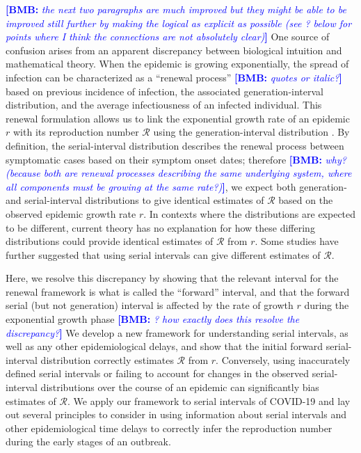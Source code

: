\documentclass[12pt]{article}
\newcommand{\comment}{\showcomment}
\newcommand{\showcomment}[3]{\textcolor{#1}{\textbf{[#2: }\textsl{#3}\textbf{]}}}
\newcommand{\bmb}[1]{\comment{blue}{BMB}{#1}}
\newcommand{\RR}{\ensuremath{{\mathcal R}}\xspace}
\begin{document}
\bmb{the next two paragraphs are much improved but they might be able to be improved still further by making the logical as explicit as possible (see ? below for points where I think the connections are not absolutely clear)}
One source of confusion arises from an apparent discrepancy between biological intuition and mathematical theory.
When the epidemic is growing exponentially, the spread of infection can be characterized as a ``renewal process'' \bmb{quotes or italic?} based on previous incidence of infection, the associated generation-interval distribution, and the average infectiousness of an infected individual.
This renewal formulation allows us to link the exponential growth rate of an epidemic $r$ with its reproduction number \RR using the generation-interval distribution \citep{wallinga2007generation}.
By definition, the serial-interval distribution describes the renewal process between symptomatic cases based on their symptom onset dates;
therefore \bmb{why? (because both are renewal processes describing the same underlying system, where all components must be growing at the same rate?)}, we expect both generation- and serial-interval distributions to give identical estimates of \RR based on the observed epidemic growth rate $r$.
In contexts where the distributions are expected to be different, current theory has no explanation for how these differing distributions could provide identical estimates of \RR from $r$. 
Some studies have further suggested that using serial intervals can give different estimates of \RR \citep{britton2019estimation, ganyani2020estimating}.

Here, we resolve this discrepancy by showing that the relevant interval for the renewal framework is what is called the ``forward'' interval, and that the forward serial (but not generation) interval is affected by the rate of growth $r$ during the exponential growth phase  \bmb{? how exactly does this resolve the discrepancy?}
We develop a new framework for understanding serial intervals, as well as any other epidemiological delays, and show that the initial forward serial-interval distribution correctly estimates \RR from $r$.
Conversely, using inaccurately defined serial intervals or failing to account for changes in the observed serial-interval distributions over the course of an epidemic can significantly bias estimates of \RR.
We apply our framework to serial intervals of COVID-19 and lay out several principles to consider in using information about serial intervals and other epidemiological time delays to correctly infer the reproduction number during the early stages of an outbreak.
\end{document}
